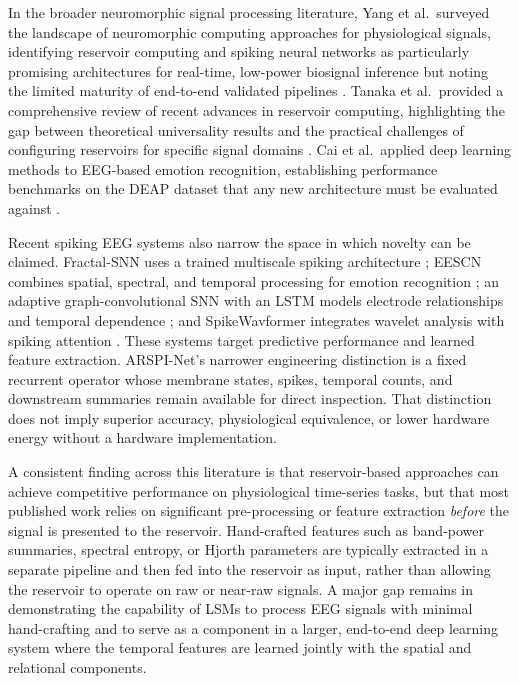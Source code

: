 In the broader neuromorphic signal processing literature, Yang et al.\ surveyed the landscape of neuromorphic computing approaches for physiological signals, identifying reservoir computing and spiking neural networks as particularly promising architectures for real-time, low-power biosignal inference but noting the limited maturity of end-to-end validated pipelines \cite{yang_neuromorphic_2023}. Tanaka et al.\ provided a comprehensive review of recent advances in reservoir computing, highlighting the gap between theoretical universality results and the practical challenges of configuring reservoirs for specific signal domains \cite{tanaka_recent_2019}. Cai et al.\ applied deep learning methods to EEG-based emotion recognition, establishing performance benchmarks on the DEAP dataset that any new architecture must be evaluated against \cite{cai_eeg-based_2024}.

Recent spiking EEG systems also narrow the space in which novelty can be claimed. Fractal-SNN uses a trained multiscale spiking architecture \cite{li_fractal_snn_2023}; EESCN combines spatial, spectral, and temporal processing for emotion recognition \cite{xu_eescn_2024}; an adaptive graph-convolutional SNN with an LSTM models electrode relationships and temporal dependence \cite{gong_adaptive_graph_snn_2023}; and SpikeWavformer integrates wavelet analysis with spiking attention \cite{yuan_spikewavformer_2025}. These systems target predictive performance and learned feature extraction. ARSPI-Net's narrower engineering distinction is a fixed recurrent operator whose membrane states, spikes, temporal counts, and downstream summaries remain available for direct inspection. That distinction does not imply superior accuracy, physiological equivalence, or lower hardware energy without a hardware implementation.

A consistent finding across this literature is that reservoir-based approaches can achieve competitive performance on physiological time-series tasks, but that most published work relies on significant pre-processing or feature extraction \emph{before} the signal is presented to the reservoir. Hand-crafted features such as band-power summaries, spectral entropy, or Hjorth parameters are typically extracted in a separate pipeline and then fed into the reservoir as input, rather than allowing the reservoir to operate on raw or near-raw signals. A major gap remains in demonstrating the capability of LSMs to process EEG signals with minimal hand-crafting and to serve as a component in a larger, end-to-end deep learning system where the temporal features are learned jointly with the spatial and relational components.

